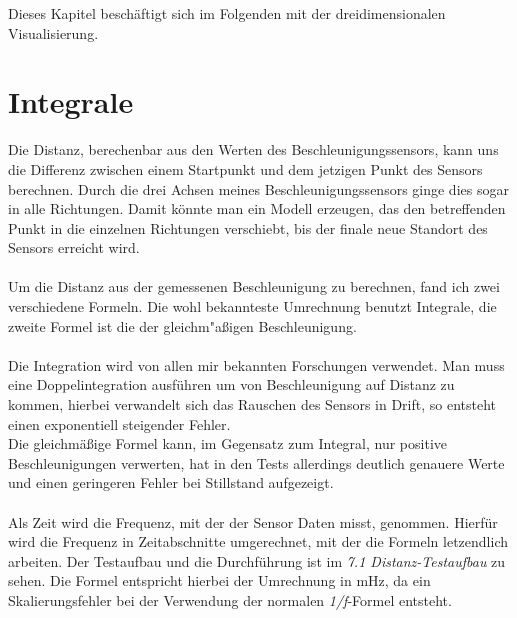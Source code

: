 Dieses Kapitel beschäftigt sich im Folgenden mit der dreidimensionalen Visualisierung.

\section{Integrale}
Die Distanz, berechenbar aus den Werten des Beschleunigungssensors, kann uns die Differenz zwischen einem Startpunkt
und dem jetzigen Punkt des Sensors berechnen. Durch die drei Achsen meines Beschleunigungssensors ginge dies sogar in alle Richtungen. Damit 
könnte man ein Modell erzeugen, das den betreffenden Punkt in die einzelnen Richtungen verschiebt, bis der finale
neue Standort des Sensors erreicht wird. \\ 
\\ 
Um die Distanz aus der gemessenen Beschleunigung zu berechnen,
fand ich zwei verschiedene Formeln. Die wohl bekannteste Umrechnung 
benutzt Integrale, die zweite Formel ist die der gleichm"aßigen 
Beschleunigung.\\
\\
Die Integration wird von allen mir bekannten Forschungen verwendet. 
Man muss eine Doppelintegration
ausführen um von Beschleunigung auf Distanz zu kommen, hierbei verwandelt 
sich das Rauschen des Sensors in Drift, so entsteht einen exponentiell steigender
Fehler. \\ 
Die gleichmäßige Formel kann, im Gegensatz zum Integral, nur positive 
Beschleunigungen verwerten, hat in den Tests allerdings 
deutlich genauere Werte und einen geringeren Fehler bei Stillstand 
aufgezeigt. \\
\\
Als Zeit wird die Frequenz, mit der der Sensor Daten misst, 
genommen. Hierfür wird die Frequenz in Zeitabschnitte umgerechnet, mit 
der die Formeln letzendlich arbeiten. Der Testaufbau und die Durchführung 
ist im \textit{ 7.1 Distanz-Testaufbau} zu sehen. Die Formel entspricht hierbei der 
Umrechnung in mHz, da ein Skalierungsfehler bei der Verwendung der normalen \textit{1/f}-Formel entsteht.


